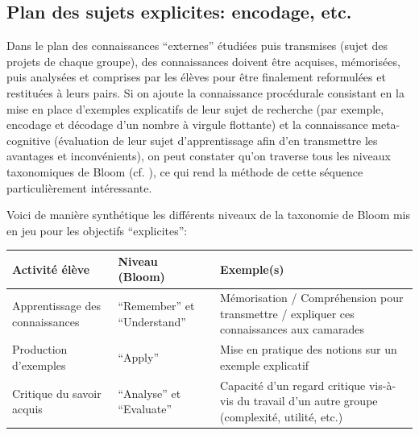 \documentclass[11pt,bibliography=totoc]{scrartcl}
\newcommand\ajout[1]{{\color{blue} #1}}
\begin{document}
\subsection{Plan des sujets explicites: encodage, etc.}
Dans le plan des connaissances ``externes'' étudiées puis transmises (sujet des
projets de chaque groupe), des connaissances doivent être acquises, mémorisées,
puis analysées et comprises par les élèves pour être finalement reformulées et
restituées à leurs pairs. Si on ajoute la connaissance procédurale consistant en
la mise en place d'exemples explicatifs de leur sujet de recherche (par exemple,
encodage et décodage d'un nombre à virgule flottante) et la connaissance
meta-cognitive (évaluation de leur sujet d'apprentissage afin d'en transmettre
les avantages et inconvénients), on peut constater qu'on traverse tous les
niveaux taxonomiques de Bloom (cf. \cite{bloom}), ce qui rend la méthode de cette séquence
particulièrement intéressante. 
\ajout{
Voici de manière synthétique les différents niveaux de la taxonomie de Bloom mis en jeu pour les objectifs ``explicites'':

\begin{center}
   \begin{tabular}{| m{.2\textwidth} | m{.2\textwidth} | m{.5\textwidth} | }
     \hline
     Activité élève & Niveau (Bloom) & Exemple(s) \\ 
     \hline
     Apprentissage des connaissances & ``Remember'' et ``Understand'' & Mémorisation / Compréhension pour transmettre / expliquer ces connaissances aux camarades \\ 
     \hline
     Production d'exemples & ``Apply'' & Mise en pratique des notions sur un exemple explicatif \\
     \hline
     Critique du savoir acquis & ``Analyse'' et ``Evaluate'' & Capacité d'un
                                                               regard critique
                                                               vis-à-vis du
                                                               travail d'un
                                                               autre groupe (complexité, utilité, etc.) \\
     \hline
   \end{tabular}
 \end{center}
}
\end{document}
